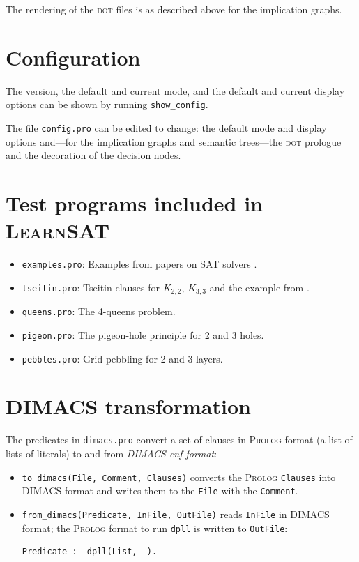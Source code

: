 \documentclass[11pt]{report}
\newcommand*{\p}[1]{\textup{\texttt{#1}}}
\newcommand*{\ls}{\textsc{LearnSAT}}
\newcommand*{\pl}{\textsc{Prolog}}
\newcommand*{\dt}{\textsc{dot}}
\begin{document}
The rendering of the \dt{} files is as described above for the
implication graphs.

\section{Configuration}


The version, the default and current mode, and the default and
current display options can be shown by running \p{show\_config}.

The file \p{config.pro} can be edited to change: the default mode and
display options and---for the implication graphs and semantic
trees---the \dt{} prologue and the decoration of the decision nodes.


\newpage


\section{Test programs included in \ls{}}

\begin{itemize}
\item \p{examples.pro}: Examples from papers on SAT
solvers \cite{mz,mlm,ms}.

\item \p{tseitin.pro}: Tseitin clauses for $K_{2,2}$,
$K_{3,3}$ and the example from \cite[Section 4.5]{mlcs}.

\item \p{queens.pro}: The 4-queens problem.

\item \p{pigeon.pro}: The pigeon-hole principle for 2 and 3 holes.

\item \p{pebbles.pro}: Grid pebbling for 2 and 3 layers.
\end{itemize}

\section{DIMACS transformation}

The predicates in \p{dimacs.pro} convert a set of clauses in
\pl{} format (a list of lists of literals) to and from \emph{DIMACS cnf
format}:
\begin{itemize}
\item \p{to\_dimacs(File, Comment, Clauses)} converts the \pl{}
\p{Clauses} into DIMACS format and writes them to the \p{File} with the
\p{Comment}.
\item \p{from\_dimacs(Predicate, InFile, OutFile)} reads \p{InFile} in
DIMACS format; the \pl{} format to run \p{dpll} is written to
\p{OutFile}:
\begin{verbatim}
Predicate :- dpll(List, _).
\end{verbatim}
\end{itemize}
\end{document}
